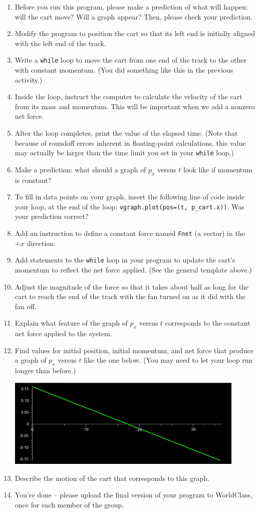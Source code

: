 \documentclass[11pt]{article}
\begin{document}
\begin{enumerate}
\item Before you run this program, please make a prediction of what will
happen: will the cart move?  Will a graph appear?  
Then, please check your prediction.
\item Modify the program to position the cart so that its left end is initially 
aligned with the left end of the track.
\item  Write a {\texttt{while}} loop to move the cart from one end of the track to the other with constant momentum.  (You did something like this in 
the previous activity.)
\item Inside the loop, instruct the computer to calculate the velocity of the cart from its mass and momentum. This will be important when we add a nonzero net force.
\item After the loop completes, print the value of the elapsed time. (Note that because of roundoff errors inherent in floating-point calculations, this value may actually be larger than the time limit you set in your {\texttt{while}} loop.)
\item Make a prediction: what should a graph of $p_x$ versus $t$ look like if momentum is constant? 
\item To fill in data points on your graph, insert the following line of code inside your loop, at the end of the loop: {\texttt{vgraph.plot(pos=(t, p\_cart.x))}}.  Was your prediction correct?
\item Add an instruction to define a constant force named {\texttt{Fnet}} (a vector) in the $+x$ direction. 
\item Add statements to the {\texttt{while}} loop in your program to update the cart's momentum to reflect the net force applied.  (See the general template above.)
\item Adjust the magnitude of the force so that it takes about half as long for the cart to reach the end of the track
with the fan turned on as it did with the fan off.
\item Explain what feature of the graph of $p_x$ versus $t$ corresponds to the constant net force applied to the system.
\item Find values for initial position, initial momentum, and net force that produce a graph of $p_x$ versus $t$ like the one below.  (You may need to let your loop run longer than before.)

\includegraphics[width=0.9\textwidth]{px_vs_t_2.JPG}

\item Describe the motion of the cart that corresponds to this graph.

\item You're done -- please upload the final version of your program to
  WorldClass, once for each member of the group.

\end{enumerate}
\end{document}
